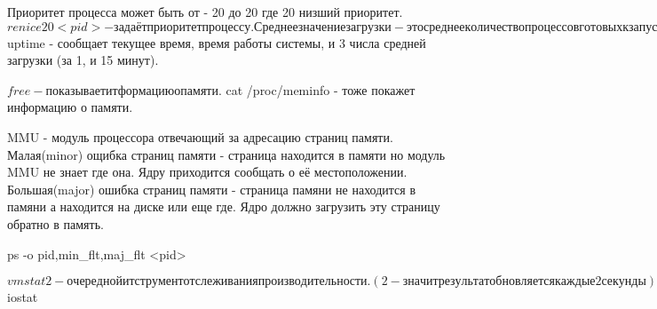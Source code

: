 Приоритет процесса может быть от - 20 до 20 где 20 низший приоритет.
$ renice 20 <pid> - задаёт приоритет процессу.
Среднее значение загрузки - это среднее количество процессов готовых к запуску 
                            (на исполнение для процесора).
$ uptime - сообщает текущее время, время работы системы, и 3 числа средней
загрузки (за 1, и 15 минут).

$ free - показывает итформацию о памяти.
$ cat /proc/meminfo - тоже покажет информацию о памяти.

MMU - модуль процессора отвечающий за адресацию страниц памяти.
    Малая(minor) ощибка страниц памяти - страница находится в памяти но модуль 
MMU не знает где она. Ядру приходится сообщать о её местоположении.
    Большая(major) ошибка страниц памяти - страница памяни не находится в памяни 
а находится на диске или еще где. Ядро должно загрузить эту страницу обратно в
память.

ps -o pid,min_flt,maj_flt <pid> 

$ vmstat 2 - очередной итструмент отслеживания производительности. (2 - значит
результат обновляется каждые 2 секунды).
Поля: %
proc:
 r - run
 b - blocked (запуск не разрешён)
memory:
 swpd - перемещено Kb на диск.
 free - свободно Kb памяти.
 buff - объём памяти для дисковых буферов.
swap:
 si - swap in.(не обязательно свап, может еще читать dll)
 so - swap out.
io:
 bi - blocks in
 bo - blocks out
system:
 in -
 cs -
cpu:
 us - %
 sy - %
 id - %
 wa - %

$ iostat
